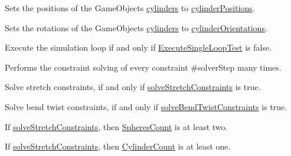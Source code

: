 \begin{DoxyRefList}
Sets the positions of the Game\+Objects \mbox{\hyperlink{class_guidewire_sim_1_1_simulation_loop_adff65d2c5dc025e8327d0926dc492a2f}{cylinders}} to \mbox{\hyperlink{class_guidewire_sim_1_1_simulation_loop_a652e8740ea1a58aa6aa49d2620af1734}{cylinder\+Positions}}. 



Sets the rotations of the Game\+Objects \mbox{\hyperlink{class_guidewire_sim_1_1_simulation_loop_adff65d2c5dc025e8327d0926dc492a2f}{cylinders}} to \mbox{\hyperlink{class_guidewire_sim_1_1_simulation_loop_a64a33d51ea4c69689c07b29d12e2597f}{cylinder\+Orientations}}.  
\item[Member \mbox{\hyperlink{class_guidewire_sim_1_1_simulation_loop_a14cef7deee44f32995d8929d69d3d373}{Guidewire\+Sim.Simulation\+Loop.Fixed\+Update}} ()]\label{requirement__requirement000018}%
%
 Execute the simulation loop if and only if \mbox{\hyperlink{class_guidewire_sim_1_1_simulation_loop_ac4d002113fbb86c676936cf79bec62e2}{Execute\+Single\+Loop\+Test}} is false.  
\item[Member \mbox{\hyperlink{class_guidewire_sim_1_1_simulation_loop_a0f03649bc05cb8297d40116708b0925c}{Guidewire\+Sim.Simulation\+Loop.Perform\+Constraint\+Solving\+Step}} ()]\label{requirement__requirement000020}%
%
 Performs the constraint solving of every constraint \#solver\+Step many times. 



Solve stretch constraints, if and only if \mbox{\hyperlink{class_guidewire_sim_1_1_simulation_loop_ac137704c785d76e873c319628552c13c}{solve\+Stretch\+Constraints}} is true. 



Solve bend twist constraints, if and only if \mbox{\hyperlink{class_guidewire_sim_1_1_simulation_loop_a90c6c5c53241222d0dc73a95f1659561}{solve\+Bend\+Twist\+Constraints}} is true. 



If \mbox{\hyperlink{class_guidewire_sim_1_1_simulation_loop_ac137704c785d76e873c319628552c13c}{solve\+Stretch\+Constraints}}, then \mbox{\hyperlink{class_guidewire_sim_1_1_simulation_loop_a888a52671506bb05713182f7c1ab3a7f}{Spheres\+Count}} is at least two. 



If \mbox{\hyperlink{class_guidewire_sim_1_1_simulation_loop_ac137704c785d76e873c319628552c13c}{solve\+Stretch\+Constraints}}, then \mbox{\hyperlink{class_guidewire_sim_1_1_simulation_loop_a74a6cb09e5dd74946aa0116e612c334d}{Cylinder\+Count}} is at least one. 




\end{DoxyRefList}
